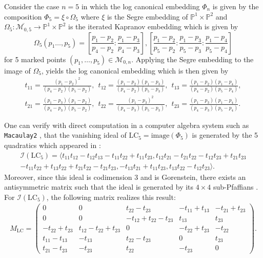 \documentclass[12pt, reqno]{amsart}
\numberwithin{equation}{section}
\theoremstyle{plain}
\theoremstyle{definition}
\newenvironment{example}
  {\pushQED{\qed}\renewcommand{\qedsymbol}{$\triangle$}\examplex}
  {\popQED\endexamplex}
\newcommand{\pp}{\mathbb{P}}
\newcommand{\cm}{\mathcal{M}}
\newcommand{\ci}{\mathcal{I}}
\newcommand{\lc}{\mathrm{LC}}
\begin{document}
\begin{example}
\label{ex:log-canon-5}
Consider the case $n = 5$ in which the log canonical embedding $\Phi_n$ is given by the composition $\Phi_5 = \xi  \circ  \Omega_5$ where $\xi$ is the Segre embedding of $\pp^1 \times \pp^2$ and $\Omega_5: \overline{\cm_{0, 5}} \to \pp^1 \times \pp^2$ is the iterated Kapranov embedding which is given by
\[
\Omega_5(p_1 \ldots, p_5) = \left[\frac{p_1 - p_2}{p_4 - p_2} : \frac{p_1 - p_3}{p_4 -p_3}\right], \left[\frac{p_1 - p_2}{p_5 - p_2} : \frac{p_1 - p_3}{p_5 -p_3} : \frac{p_1 - p_4}{p_5 -p_4}\right]
\]
for 5 marked points $(p_1, \ldots, p_5) \in \cm_{0, n}$. Applying the Segre embedding to the image of $\Omega_5$, yields the log canonical embedding which is then given by
\begin{align*}
t_{11} = \frac{(p_1 - p_2)^2}{(p_4 - p_2)(p_5 - p_2)},~~  t_{12} = \frac{(p_1 - p_2)(p_1 - p_3)}{(p_4 - p_2)(p_5 - p_3)},~~  t_{13} = \frac{(p_1 - p_2)(p_1 - p_4)}{(p_4 - p_2)(p_5 - p_4)},\\
t_{21} = \frac{(p_1 - p_3)(p_1 - p_2)}{(p_4 - p_3)(p_5 - p_2)},~~  t_{22} = \frac{(p_1 - p_3)^2}{(p_4 - p_3)(p_5 - p_3)},~~ t_{23} = \frac{(p_1 - p_3)(p_1 - p_4)}{(p_4 - p_3)(p_5 - p_4)}.
\end{align*}

One can verify with direct computation in a computer algebra system such as \texttt{Macaulay2} \cite{M2}, that the vanishing ideal of $\lc_5 = \mathrm{image}(\Phi_5)$ is generated by the 5 quadratics which appeared in \cite[Corollary 1.3]{monin2017equations}:
\begin{align*}
\ci(\lc_5) =  
\langle
t_{11}t_{12}-t_{12}t_{13}-t_{11}t_{22}+t_{11}t_{23}, t_{12}t_{21}-t_{21}t_{22}-t_{12}t_{23}+t_{21}t_{23}\\
-t_{11}t_{22}+t_{13}t_{22}+t_{21}t_{22}-t_{21}t_{23}, -t_{13}t_{21}+t_{11}t_{23}, t_{13}t_{22}-t_{12}t_{23}
\rangle. 
\end{align*}
Moreover, since this ideal is codimension 3 and is Gorenstein, there exists an antisymmetric matrix such that the ideal is generated by its $4 \times 4$ sub-Pfaffians \cite[Theorem 2.1]{buchsbaum1977algebra}. For $\ci(\lc_5)$, the following matrix realizes this result: 
\begin{align*}
M_\lc = \begin{pmatrix}
0& 0& t_{22}-t_{23}& -t_{11}+t_{13}& -t_{21}+t_{23} \\
0& 0&-t_{12}+t_{22}-t_{23}& t_{13}& t_{23} \\
-t_{22}+t_{23}& t_{12}-t_{22}+t_{23}& 0& -t_{22}+t_{23}& -t_{22} \\
t_{11}-t_{13}&-t_{13}& t_{22}-t_{23}& 0& t_{23} \\
t_{21}-t_{23}& -t_{23}& t_{22}&-t_{23}& 0
\end{pmatrix}.
\end{align*}
\end{example}
\end{document}
